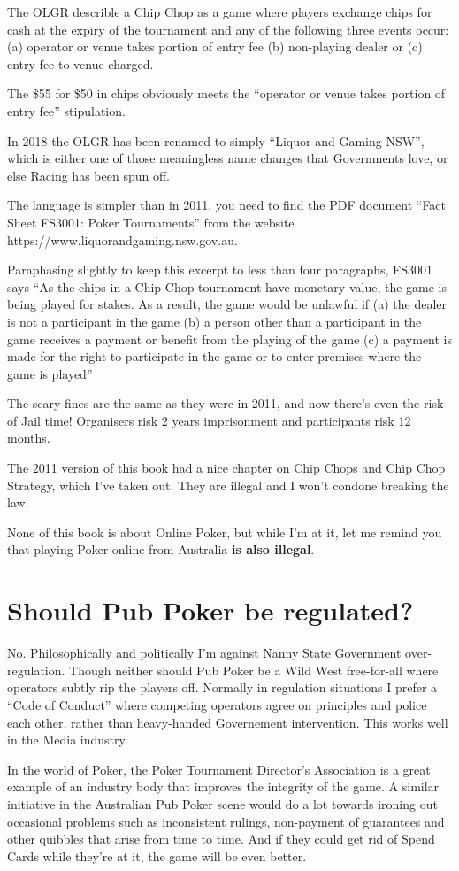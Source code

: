The OLGR describle a Chip Chop as a game where players exchange chips for
cash at the expiry of the tournament and any of the following three
events occur: (a) operator or venue takes portion of entry fee
(b) non-playing dealer or (c) entry fee to venue charged.


The \$55 for \$50 in chips obviously meets the ``operator or venue takes
portion of entry fee'' stipulation.

In 2018 the OLGR has been renamed to simply
``Liquor and Gaming NSW'', which is either one of those meaningless
name changes that Governments love, or else Racing has been spun off.

The language is simpler than in 2011, you need to find
the PDF document ``Fact Sheet FS3001: Poker Tournaments'' from
the website https://www.liquorandgaming.nsw.gov.au.

Paraphasing slightly to keep this excerpt to less than four paragraphs,
FS3001 says ``As the chips in a Chip-Chop tournament
have monetary value, the game is being played for stakes. As a result,
the game would be unlawful if (a) the dealer is not a participant in the game
(b) a person other than a participant in the game receives a payment
or benefit from the playing of the game (c) a payment is made for the
right to participate in the game or to enter premises where the game
is played''

The scary fines are the same as they were in 2011, and now there's even
the risk of Jail time! Organisers risk 2 years imprisonment and
participants risk 12 months.

The 2011 version of this book had a nice chapter on Chip Chops and
Chip Chop Strategy, which I've taken out. They are illegal and I
won't condone breaking the law.

None of this book is about Online Poker, but while I'm at it,
let me remind you that playing Poker online from Australia
\textbf{is also illegal}.

\section{Should Pub Poker be regulated?}

No. Philosophically and politically I'm against Nanny State
Government over-regulation. Though neither should Pub Poker
be a Wild West free-for-all where operators subtly rip the players
off. Normally in regulation situations I prefer a ``Code of Conduct''
where competing operators agree on principles and police each other,
rather than heavy-handed Governement intervention. This works well
in the Media industry.

In the world of Poker, the Poker Tournament Director's Association
is a great example of an industry body that improves the integrity
of the game. A similar initiative in the Australian Pub Poker scene
would do a lot towards ironing out occasional problems such as
inconsistent rulings, non-payment of guarantees and other quibbles
that arise from time to time. And if they could get rid of Spend Cards
while they're at it, the game will be even better.



